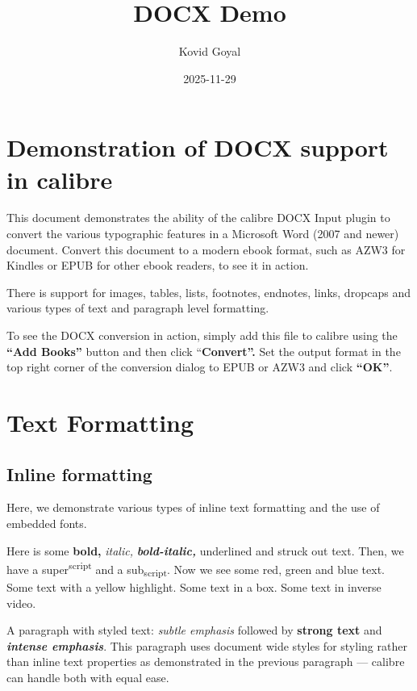 \documentclass[\officeparserdriver 12pt]{article}
\title{DOCX Demo}
\author{Kovid Goyal}
\date{2025-11-29}
\begin{document}
\section[{Demonstration of DOCX support in calibre}]{\protect\textcolor{hex17365D}{Demonstration of DOCX support in calibre}}\label{demonstration-of-docx-support-in-calibre}

This document demonstrates the ability of the calibre DOCX Input plugin to convert the various typographic features in a Microsoft Word (2007 and newer) document. Convert this document to a modern ebook format, such as AZW3 for Kindles or EPUB for other ebook readers, to see it in action.

There is support for images, tables, lists, footnotes, endnotes, links, dropcaps and various types of text and paragraph level formatting.

To see the DOCX conversion in action, simply add this file to calibre using the \textbf{“Add Books” }button and then click “\textbf{Convert”. }Set the output format in the top right corner of the conversion dialog to EPUB or AZW3 and click \textbf{“OK”}.

\clearpage

\section[{Text Formatting}]{\protect\textcolor{hex365F91}{Text Formatting}}\label{text-formatting}

\subsection[{Inline formatting}]{\protect\textcolor{hex4F81BD}{Inline formatting}}\label{inline-formatting}

Here, we demonstrate various types of inline text formatting and the use of embedded fonts.

Here is some \textbf{bold, }\textit{italic, }\textit{\textbf{bold-italic, }}underlined and struck out text. Then, we have a super\textsuperscript{{\fontsize{8pt}{9.6pt}\selectfont script }}and a sub\textsubscript{{\fontsize{8pt}{9.6pt}\selectfont script}}. Now we see some red, green and blue text. Some text with a yellow highlight. Some text in a box. Some text in inverse video.

A paragraph with styled text: \textit{subtle emphasis }followed by \textbf{strong text }and \textit{\textbf{intense emphasis}}. This paragraph uses document wide styles for styling rather than inline text properties as demonstrated in the previous paragraph — calibre can handle both with equal ease.
\end{document}
